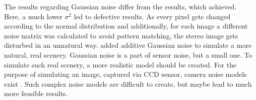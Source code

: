 The results regarding Gaussian noise differ from the results, which \citeauthor{richardt2010real} \citep{richardt2010real} achieved.
Here, a much lower $\sigma^2$ led to defective results.
As every pixel gets changed according to the normal distribution and additionally, for each image a different noise matrix was calculated to avoid pattern matching, the stereo image gets disturbed in an unnatural way.
\citeauthor{richardt2010real} added additive Gaussian noise to simulate a more natural, real scenery.
Gaussian noise is a part of sensor noise, but a small one.
To simulate such real scenery, a more realistic model should be created.
For the purpose of simulating an image, captured via CCD sensor, camera noise models exist \citep{liu2006noise}.
Such complex noise models are difficult to create, but maybe lead to much more feasible results.


























